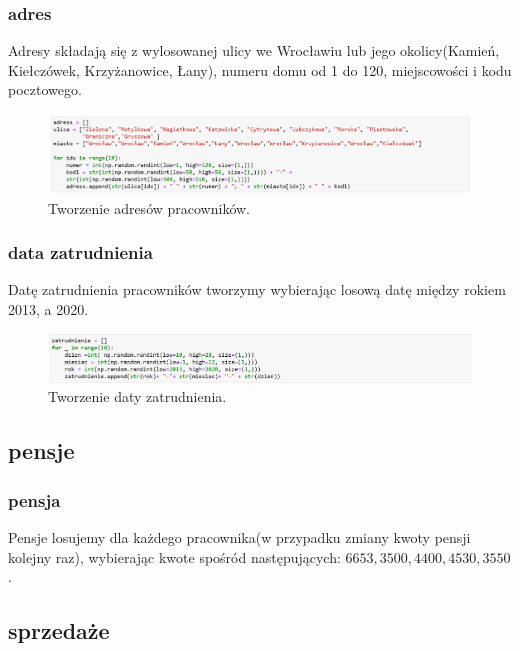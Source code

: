 \documentclass[12pt, letterpaper]{article}
\begin{document}
\subsubsection{adres}

Adresy składają się z wylosowanej ulicy we Wrocławiu lub jego okolicy(Kamień, Kiełczówek, Krzyżanowice, Łany), numeru domu od 1 do 120, miejscowości i kodu pocztowego.
\begin{figure}[h!]
	\centering
	\includegraphics[width=1.0\textwidth]{5.png}
	\caption{Tworzenie adresów pracowników.}
\end{figure}

\subsubsection{data zatrudnienia}
Datę zatrudnienia pracowników tworzymy wybierając losową datę między rokiem 2013, a 2020. 
\begin{figure}[h!]
	\centering
	\includegraphics[width=1.0\textwidth]{6.png}
	\caption{Tworzenie daty zatrudnienia.}
\end{figure}


\subsection{pensje}
\subsubsection{pensja}
Pensje losujemy dla każdego pracownika(w przypadku zmiany kwoty pensji kolejny raz), wybierając kwote spośród następujących: $6653,3500,4400,4530,3550$.




\subsection{sprzedaże}
\end{document}
